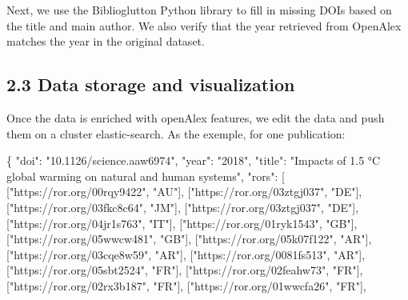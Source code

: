 \documentclass[
]{article}
\newenvironment{Shaded}{}{}
\newcommand{\DataTypeTok}[1]{\textcolor[rgb]{0.56,0.13,0.00}{#1}}
\newcommand{\FunctionTok}[1]{\textcolor[rgb]{0.02,0.16,0.49}{#1}}
\newcommand{\OtherTok}[1]{\textcolor[rgb]{0.00,0.44,0.13}{#1}}
\newcommand{\StringTok}[1]{\textcolor[rgb]{0.25,0.44,0.63}{#1}}
\begin{document}
Next, we use the Biblioglutton Python library to fill in missing DOIs
based on the title and main author. We also verify that the year
retrieved from OpenAlex matches the year in the original dataset.

\hypertarget{data-storage-and-visualization}{%
\subsection{2.3 Data storage and
visualization}\label{data-storage-and-visualization}}

Once the data is enriched with openAlex features, we edit the data and
push them on a cluster elastic-search. As the exemple, for one
publication:

\begin{Shaded}
\begin{Highlighting}[]
\FunctionTok{\{}
  \DataTypeTok{"doi"}\FunctionTok{:} \StringTok{"10.1126/science.aaw6974"}\FunctionTok{,}
  \DataTypeTok{"year"}\FunctionTok{:} \StringTok{"2018"}\FunctionTok{,}
  \DataTypeTok{"title"}\FunctionTok{:} \StringTok{"Impacts of 1.5 °C global warming on natural and human systems"}\FunctionTok{,}
  \DataTypeTok{"rors"}\FunctionTok{:} \OtherTok{[}
    \OtherTok{[}\StringTok{"https://ror.org/00rqy9422"}\OtherTok{,} \StringTok{"AU"}\OtherTok{],}
    \OtherTok{[}\StringTok{"https://ror.org/03ztgj037"}\OtherTok{,} \StringTok{"DE"}\OtherTok{],}
    \OtherTok{[}\StringTok{"https://ror.org/03fkc8c64"}\OtherTok{,} \StringTok{"JM"}\OtherTok{],}
    \OtherTok{[}\StringTok{"https://ror.org/03ztgj037"}\OtherTok{,} \StringTok{"DE"}\OtherTok{],}
    \OtherTok{[}\StringTok{"https://ror.org/04jr1s763"}\OtherTok{,} \StringTok{"IT"}\OtherTok{],}
    \OtherTok{[}\StringTok{"https://ror.org/01ryk1543"}\OtherTok{,} \StringTok{"GB"}\OtherTok{],}
    \OtherTok{[}\StringTok{"https://ror.org/05wwcw481"}\OtherTok{,} \StringTok{"GB"}\OtherTok{],}
    \OtherTok{[}\StringTok{"https://ror.org/05k07f122"}\OtherTok{,} \StringTok{"AR"}\OtherTok{],}
    \OtherTok{[}\StringTok{"https://ror.org/03cqe8w59"}\OtherTok{,} \StringTok{"AR"}\OtherTok{],}
    \OtherTok{[}\StringTok{"https://ror.org/0081fs513"}\OtherTok{,} \StringTok{"AR"}\OtherTok{],}
    \OtherTok{[}\StringTok{"https://ror.org/05sbt2524"}\OtherTok{,} \StringTok{"FR"}\OtherTok{],}
    \OtherTok{[}\StringTok{"https://ror.org/02feahw73"}\OtherTok{,} \StringTok{"FR"}\OtherTok{],}
    \OtherTok{[}\StringTok{"https://ror.org/02rx3b187"}\OtherTok{,} \StringTok{"FR"}\OtherTok{],}
    \OtherTok{[}\StringTok{"https://ror.org/01wwcfa26"}\OtherTok{,} \StringTok{"FR"}\OtherTok{],}

\end{Highlighting}
\end{Shaded}
\end{document}

